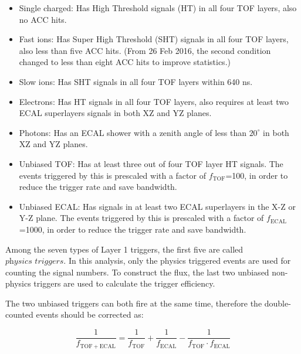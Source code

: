 \begin{itemize}
\item Single charged: Has High Threshold signals (HT) in all four TOF layers, also no ACC hits. 

\item Fast ions: Has Super High Threshold (SHT) signals in all four TOF layers, also less than five ACC hits. (From 26 Feb 2016, the second condition changed to less than eight ACC hits to improve statistics.)

\item Slow ions: Has SHT signals in all four TOF layers within 640 ns. 

\item Electrons: Has HT signals in all four TOF layers, also requires at least two ECAL superlayers signals in both XZ and YZ planes. 

\item Photons: Has an ECAL shower with a zenith angle of less than $20^{\circ}$ in both XZ and YZ planes. 


\item Unbiased TOF:  Has at least three out of four TOF layer HT signals. The events triggered by this is prescaled with a factor of $f_{\mathrm{TOF}}$=100, in order to reduce the trigger rate and save bandwidth. 

\item Unbiased ECAL: Has signals in at least two ECAL superlayers in the X-Z or Y-Z plane. The events triggered by this is prescaled with a factor of $f_{\mathrm{ECAL}}$=1000, in order to reduce the trigger rate and save bandwidth. 

\end{itemize}

Among the seven types of Layer 1 triggers, the first five are called $\textit{physics triggers}$. In this analysis, only the physics triggered events are used for counting the signal numbers. To construct the flux, the last two unbiased non-physics triggers are used to calculate the trigger efficiency.

The two unbiased triggers can both fire at the same time, therefore the double-counted events should be corrected as:

\begin{equation}
\frac{1}{f_{\mathrm{TOF+ECAL}}} = \frac{1}{f_{\mathrm{TOF}}} + \frac{1}{f_{\mathrm{ECAL}}} - \frac{1} { f_{\mathrm{TOF}} \cdot f_{\mathrm{ECAL}} } 
\end{equation}

